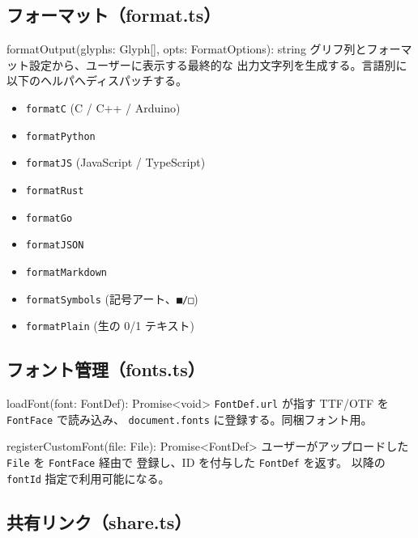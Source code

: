 \subsection{フォーマット（format.ts）}

\begin{funcblock}{formatOutput(glyphs: Glyph[], opts: FormatOptions): string}
グリフ列とフォーマット設定から、ユーザーに表示する最終的な
出力文字列を生成する。言語別に以下のヘルパへディスパッチする。

\begin{itemize}[leftmargin=*,itemsep=1pt]
  \item \texttt{formatC} (C / C++ / Arduino)
  \item \texttt{formatPython}
  \item \texttt{formatJS} (JavaScript / TypeScript)
  \item \texttt{formatRust}
  \item \texttt{formatGo}
  \item \texttt{formatJSON}
  \item \texttt{formatMarkdown}
  \item \texttt{formatSymbols} (記号アート、\texttt{■/□})
  \item \texttt{formatPlain} (生の 0/1 テキスト)
\end{itemize}
\end{funcblock}

\subsection{フォント管理（fonts.ts）}

\begin{funcblock}{loadFont(font: FontDef): Promise<void>}
\texttt{FontDef.url} が指す TTF/OTF を \texttt{FontFace} で読み込み、
\texttt{document.fonts} に登録する。同梱フォント用。
\end{funcblock}

\begin{funcblock}{registerCustomFont(file: File): Promise<FontDef>}
ユーザーがアップロードした \texttt{File} を \texttt{FontFace} 経由で
登録し、ID を付与した \texttt{FontDef} を返す。
以降の \texttt{fontId} 指定で利用可能になる。
\end{funcblock}

\subsection{共有リンク（share.ts）}

